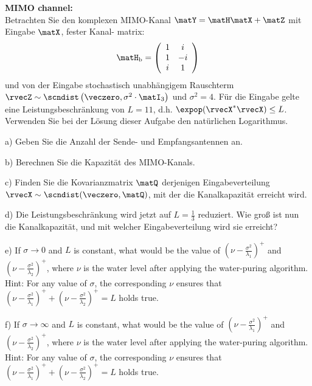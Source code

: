 \textbf{MIMO channel:}\\
Betrachten Sie den komplexen MIMO-Kanal $\matY = \matH \matX + \matZ$ mit Eingabe $\matX$, fester Kanal-
matrix:
\begin{align*}
    \matH_{\text{b}}=\left(\begin{array}{cc}
    1 & i \\
    1 & -i \\
    i & 1 \\
    \end{array}\right)
\end{align*}
und von der Eingabe stochastisch unabhängigem Rauschterm
$\rvecZ\sim\scndist\left(\veczero, \sigma^2 \cdot\matI_3\right)$ und $\sigma^2 = 4$.
Für die Eingabe gelte eine Leistungsbeschränkung von $L=11$, d.h. $\expop(\rvecX^*\rvecX) \le L$. Verwenden Sie bei der Lösung dieser
Aufgabe den natürlichen Logarithmus. 
\begin{enumref}
    \item[a)] Geben Sie die Anzahl der Sende- und Empfangsantennen an.
    \item[b)] Berechnen Sie die Kapazität des MIMO-Kanals.
    \item[c)] Finden Sie die Kovarianzmatrix $\matQ$ derjenigen Eingabeverteilung
              $\rvecX\sim\scndist(\veczero,\matQ)$, mit der die Kanalkapazität erreicht wird.
    \item[d)] Die Leistungsbeschränkung wird jetzt auf $L=\frac{1}{3}$ reduziert. Wie groß ist nun die Kanalkapazität,
              und mit welcher Eingabeverteilung wird sie erreicht?
    \item[e)] If $\sigma \rightarrow 0$ and $L$ is constant, what would be the value of $\left(\nu - \frac{\sigma^2}{\lambda_1}\right)^{+}$ and $\left(\nu - \frac{\sigma^2}{\lambda_2}\right)^{+}$, where $\nu$ is the water level after applying the water-puring algorithm. Hint: For any value of $\sigma$, the corresponding $\nu$ ensures that  $\left(\nu - \frac{\sigma^2}{\lambda_1}\right)^{+} + \left(\nu - \frac{\sigma^2}{\lambda_2}\right)^{+} = L$ holds true.
    \item[f)] If $\sigma \rightarrow \infty$ and $L$ is constant, what would be the value of $\left(\nu - \frac{\sigma^2}{\lambda_1}\right)^{+}$ and $\left(\nu - \frac{\sigma^2}{\lambda_2}\right)^{+}$, where $\nu$ is the water level after applying the water-puring algorithm. Hint: For any value of $\sigma$, the corresponding $\nu$ ensures that  $\left(\nu - \frac{\sigma^2}{\lambda_1}\right)^{+} + \left(\nu - \frac{\sigma^2}{\lambda_2}\right)^{+} = L$ holds true.
\end{enumref}

